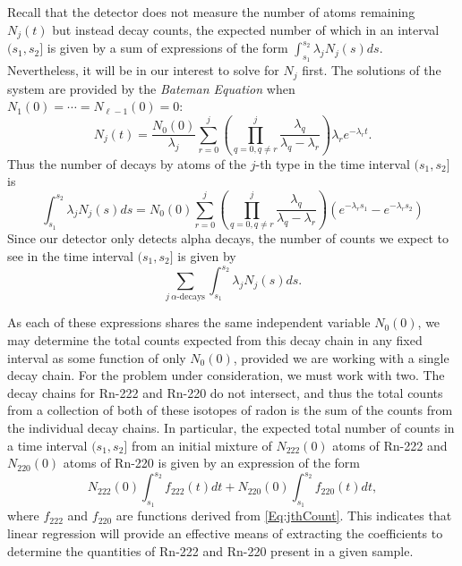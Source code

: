 \documentclass[11pt]{m2pi}
\begin{document}
Recall that the detector does not measure the number of atoms remaining $N_j(t)$ but instead decay counts, the expected number of which in an interval $(s_1,s_2]$ is given by a sum of expressions of the form $\int_{s_1}^{s_2}\lambda_j N_j(s)ds$. Nevertheless, it will be in our interest to solve for $N_j$ first.
The solutions of the system are provided by the \textit{Bateman Equation} \cite{Bateman} when $N_1(0)=\cdots=N_{\ell-1}(0)=0$:
$$
N_j(t) = \frac{N_0(0)}{\lambda_j}\sum_{r=0}^j\left(\prod_{q=0,q\neq r}^j \frac{\lambda_q}{\lambda_q-\lambda_r}\right)\lambda_r e^{-\lambda_r t}.
$$
Thus the number of decays by atoms of the $j$-th type in the time interval $(s_1,s_2]$ is
\begin{equation}\label{Eq:jthCount}
\int_{s_1}^{s_2} \lambda_j N_j(s)ds = N_0(0)\sum_{r=0}^j\left(\prod_{q=0,q\neq r}^j \frac{\lambda_q}{\lambda_q-\lambda_r}\right)(e^{-\lambda_r s_1}-e^{-\lambda_r s_2})
\end{equation}
Since our detector only detects alpha decays, the number of counts we expect to see in the time interval $(s_1,s_2]$ is given by
$$
\sum_{j \: \alpha\text{-decays}}\int_{s_1}^{s_2}\lambda_j N_j(s)ds.
$$

As each of these expressions shares the same independent variable $N_0(0)$, we may determine the total counts expected from this decay chain in any fixed interval as some function of only $N_0(0)$, provided we are working with a single decay chain.
For the problem under consideration, we must work with two.
The decay chains for Rn-222 and Rn-220 do not intersect, and thus the total counts from a collection of both of these isotopes of radon is the sum of the counts from the individual decay chains. In particular, the expected total number of counts in a time interval $(s_1,s_2]$ from an initial mixture of $N_{222}(0)$ atoms of Rn-222 and $N_{220}(0)$ atoms of Rn-220 is given by an expression of the form
\[ N_{222}(0)\int_{s_1}^{s_2}f_{222}(t)dt+N_{220}(0)\int_{s_1}^{s_2}f_{220}(t)dt, \]
where $f_{222}$ and $f_{220}$ are functions derived from \eqref{Eq:jthCount}.
This indicates that linear regression will provide an effective means of extracting the coefficients to determine the quantities of Rn-222 and Rn-220 present in a given sample.\\
\end{document}
